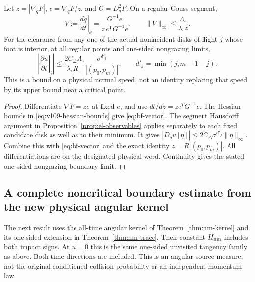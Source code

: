 \begin{proposition}
\label{prop:bf-speed}
Let $z=|\nabla_qF|$, $e=\nabla_qF/z$, and $G=D_q^2F$.
On a regular Gauss segment,
\begin{equation}\label{eq:bf-vector}
 V:=\left.\frac{dq}{dt}\right|_\theta
       =\frac{G^{-1}e}{z\,e^{\mathsf T}G^{-1}e},\qquad
 \|V\|_\infty\le\frac{\Lambda_\circ}{\lambda_\circ z}.
\end{equation}
For the clearance from any one of the actual nonincident disks of
flight $j$ whose foot is interior, at all regular points and one-sided
nongrazing limits,
\begin{equation}\label{eq:bf-speed}
 \left|\left.\frac{\partial u}{\partial t}\right|_\theta\right|
 \le \frac{2C_\Delta\Lambda_\circ}
               {\lambda_\circ R_-}
           \frac{\sigma^{d'_j}}{|(p_0,p_m)|},\qquad
 d'_j=\min(j,m-1-j).
\end{equation}
This is a bound on a physical normal speed, not an identity replacing
that speed by its upper bound near a critical point.
\end{proposition}
\begin{proof}
Differentiate $\nabla F=ze$ at fixed $e$, and use $dt/dz=z e^TG^{-1}e$.
The Hessian bounds in \eqref{eq:v109-hessian-bounds} give
\eqref{eq:bf-vector}.  The segment Hausdorff argument in
Proposition~\ref{prop:el-observables} applies separately to each fixed
candidate disk as well as to their minimum.  It gives
$|D_qu[\eta]|\le2C_\Delta\sigma^{d'_j}\|\eta\|_\infty$.
Combine this with \eqref{eq:bf-vector} and the exact identity
$z=R|(p_0,p_m)|$.  All differentiations are on the designated physical
word.  Continuity gives the stated one-sided nongrazing boundary limit.
\end{proof}

\subsection{A complete noncritical boundary estimate from the new
physical angular kernel}

The next result uses the all-time angular kernel of
Theorem~\ref{thm:nm-kernel} and its one-sided extension in
Theorem~\ref{thm:nm-trace}.  Their constant $H_{\rm nm}$ includes
both impact signs.  At $u=0$ this is the same one-sided unvisited
tangency family as above.  Both time directions are included.
This is an angular source measure, not the original conditioned
collision probability or an independent momentum law.

